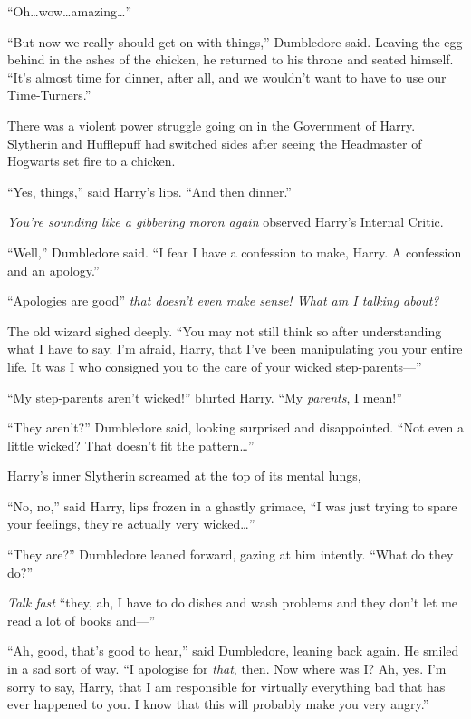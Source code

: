 “Oh…wow…amazing…”

“But now we really should get on with things,” Dumbledore said. Leaving the egg behind in the ashes of the chicken, he returned to his throne and seated himself.
“It’s almost time for dinner, after all, and we wouldn’t want to have to use our Time-Turners.”

There was a violent power struggle going on in the Government of Harry. Slytherin and Hufflepuff had switched sides after seeing the Headmaster of Hogwarts set fire to a chicken.

“Yes, things,” said Harry’s lips.
“And then dinner.”

\emph{You’re sounding like a gibbering moron again} observed Harry’s Internal Critic.

“Well,” Dumbledore said.
“I fear I have a confession to make, Harry. A confession and an apology.”

“Apologies are good” \emph{that doesn’t even make sense! What am I talking about?}

The old wizard sighed deeply.
“You may not still think so after understanding what I have to say. I’m afraid, Harry, that I’ve been manipulating you your entire life. It was I who consigned you to the care of your wicked step-parents—”

“My step-parents aren’t wicked!” blurted Harry.
“My \emph{parents}, I mean!”

“They aren’t?” Dumbledore said, looking surprised and disappointed.
“Not even a little wicked? That doesn’t fit the pattern…”

Harry’s inner Slytherin screamed at the top of its mental lungs, \emph{}

“No, no,” said Harry, lips frozen in a ghastly grimace,
“I was just trying to spare your feelings, they’re actually very wicked…”

“They are?” Dumbledore leaned forward, gazing at him intently.
“What do they do?”

\emph{Talk fast} “they, ah, I have to do dishes and wash problems and they don’t let me read a lot of books and—”

“Ah, good, that’s good to hear,” said Dumbledore, leaning back again. He smiled in a sad sort of way.
“I apologise for \emph{that}, then. Now where was I? Ah, yes. I’m sorry to say, Harry, that I am responsible for virtually everything bad that has ever happened to you. I know that this will probably make you very angry.”

